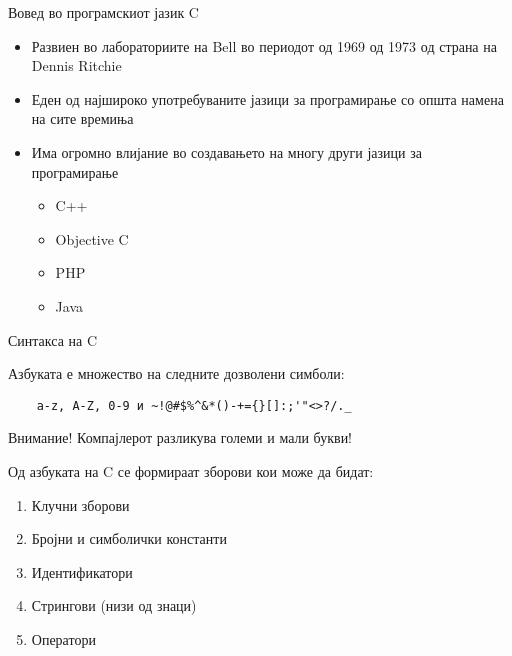 \begin{frame}{Вовед во програмскиот јазик C}
\begin{itemize}
\item Развиен во лабораториите на Bell во периодот од 1969 од 1973 од страна на Dennis Ritchie
\item Еден од најшироко употребуваните јазици за програмирање со општа намена на сите времиња
\item Има огромно влијание во создавањето на многу други јазици за програмирање
	\begin{itemize}
	\item C++
	\item Objective C
	\item PHP
	\item Java
	\end{itemize}
\end{itemize}
\end{frame}

\begin{frame}[fragile]{Синтакса на C}

  \begin{block}{Азбуката е множество на следните дозволени симболи:}
  \begin{verbatim}
  	a-z, A-Z, 0-9 и ~!@#$%^&*()-+={}[]:;'"<>?/._  
  \end{verbatim}
  \end{block}

	\begin{alertblock}{Внимание!}
	Компајлерот разликува големи и мали букви!
	\end{alertblock}

	Од азбуката на C се формираат зборови кои може да бидат:
	\begin{enumerate}
	\item Клучни зборови
	\item Бројни и симболички константи
	\item Идентификатори
	\item Стрингови (низи од знаци)
	\item Оператори
	\end{enumerate}

\end{frame}

